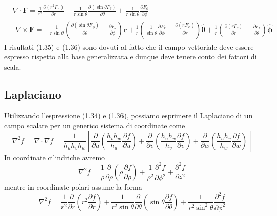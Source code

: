 \begin{equation*}
	\begin{aligned}
		&\nabla \cdot \mathbf{F}=\frac{1}{r^2} \frac{\partial\left(r^2 F_r\right)}{\partial r}+\frac{1}{r \sin \theta} \frac{\partial\left(\sin \theta F_\theta\right)}{\partial \theta}+\frac{1}{r \sin \theta} \frac{\partial F_\phi}{\partial \phi}\\[0.5cm]
		&\begin{aligned}
\nabla \times \mathbf{F}= & \frac{1}{r \sin \theta}\left(\frac{\partial\left(\sin \theta F_\phi\right)}{\partial \theta}-\frac{\partial F_\theta}{\partial \phi}\right) \hat{\mathbf{r}} +\frac{1}{r}\left(\frac{1}{\sin \theta} \frac{\partial F_r}{\partial \phi}-\frac{\partial\left(r F_\phi\right)}{\partial r}\right) \hat{\boldsymbol{\theta}} 
+\frac{1}{r}\left(\frac{\partial\left(r F_\theta\right)}{\partial r}-\frac{\partial F_r}{\partial \theta}\right) \hat{\boldsymbol{\phi}}
\end{aligned}
	\end{aligned}
\end{equation*}
I risultati (1.35) e (1.36) sono dovuti al fatto che il campo vettoriale deve essere espresso rispetto alla base generalizzata e dunque deve tenere conto dei fattori di scala.
\newpage

\subsection{Laplaciano}

Utilizzando l'espressione (1.34) e (1.36), possiamo esprimere il Laplaciano di un campo scalare per un generico sistema di coordinate come
\begin{equation}
	\nabla^2 f=\nabla \cdot \nabla f=\frac{1}{h_u h_v h_w}\left[\frac{\partial}{\partial u}\left(\frac{h_v h_w}{h_u} \frac{\partial f}{\partial u}\right)+\frac{\partial}{\partial v}\left(\frac{h_u h_w}{h_v} \frac{\partial f}{\partial v}\right)+\frac{\partial}{\partial w}\left(\frac{h_u h_v}{h_w} \frac{\partial f}{\partial w}\right)\right]
\end{equation}
In coordinate cilindriche avremo
\begin{equation*}
	\nabla^2 f=\frac{1}{\rho} \frac{\partial}{\partial \rho}\left(\rho \frac{\partial f}{\partial \rho}\right)+\frac{1}{\rho^2} \frac{\partial^2 f}{\partial \phi^2}+\frac{\partial^2 f}{\partial z^2}
\end{equation*}
mentre in coordinate polari assume la forma 
\begin{equation*}
	\nabla^2 f=\frac{1}{r^2} \frac{\partial}{\partial r}\left(r^2 \frac{\partial f}{\partial r}\right)+\frac{1}{r^2 \sin \theta} \frac{\partial}{\partial \theta}\left(\sin \theta \frac{\partial f}{\partial \theta}\right)+\frac{1}{r^2 \sin ^2 \theta} \frac{\partial^2 f}{\partial \phi^2}
\end{equation*}

